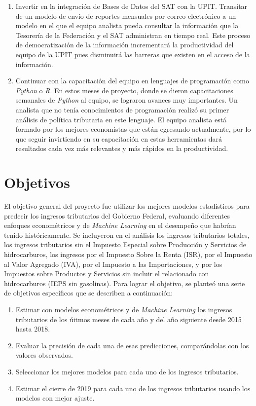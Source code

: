 \documentclass[a4paper, 11pt]{article}
\begin{document}
\begin{enumerate}
	\begin{enumerate}
		\item Invertir en la integración de Bases de Datos del SAT con la UPIT. Transitar de un modelo de envío de reportes mensuales por correo electrónico a un modelo en el que el equipo analista pueda consultar la información que la Tesorería de la Federación y el SAT administran en tiempo real. Este proceso de democratización de la información incrementará la productividad del equipo de la UPIT pues disminuirá las barreras que existen en el acceso de la información.
		\item Continuar con la capacitación del equipo en lenguajes de programación como \textit{Python} o \textit{R}. En estos meses de proyecto, donde se dieron capacitaciones semanales de \textit{Python} al equipo, se lograron avances muy importantes. Un analista que no tenía conocimientos de programación realizó su primer análisis de política tributaria en este lenguaje. El equipo analista está formado por los mejores economistas que están egresando actualmente, por lo que seguir invirtiendo en su capacitación en estas herramientas dará resultados cada vez más relevantes y más rápidos en la productividad.
	\end{enumerate}
\end{enumerate}

\section*{Objetivos}
El objetivo general del proyecto fue utilizar los mejores modelos estadísticos para predecir los ingresos tributarios del Gobierno Federal, evaluando diferentes enfoques econométricos y de \textit{Machine Learning} en el desempeño que habrían tenido históricamente. Se incluyeron en el análisis los ingresos tributarios totales, los ingresos tributarios sin el Impuesto Especial sobre Producción y Servicios de hidrocarburos, los ingresos por el Impuesto Sobre la Renta (ISR), por el Impuesto al Valor Agregado (IVA), por el Impuesto a las Importaciones, y por los Impuestos sobre Productos y Servicios sin incluir el relacionado con hidrocarburos (IEPS sin gasolinas). Para lograr el objetivo, se planteó una serie de objetivos específicos que se describen a continuación:
\begin{enumerate}
	\item Estimar con modelos econométricos y de \textit{Machine Learning} los ingresos tributarios de los úitmos meses de cada año y del año siguiente desde 2015 hasta 2018. 
	\item Evaluar la precisión de cada una de esas predicciones, comparándolas con los valores observados.
	\item Seleccionar los mejores modelos para cada uno de los ingresos tributarios.
	\item Estimar el cierre de 2019 para cada uno de los ingresos tributarios usando los modelos con mejor ajuste.
\end{enumerate}
\end{document}
